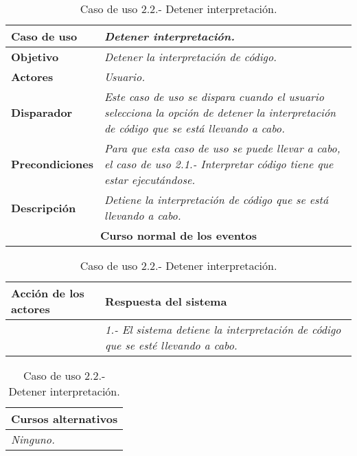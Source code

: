 \documentclass[twoside,a4paper,11pt]{book}
\begin{document}
\begin{table}[!ht]
    \centering
    \begin{tabular}{|p{4cm}|p{11.5cm}|}
    \hline

    \textbf{Caso de uso} & \textit{Detener interpretación.}\\
    \hline

    \textbf{Objetivo} & \textit{Detener la interpretación de código.}\\
    \hline

    \textbf{Actores} & \textit{Usuario.}\\
    \hline

    \textbf{Disparador} & \textit{Este caso de uso se dispara cuando el usuario selecciona la opción de detener la interpretación de código que se está
				  llevando a cabo.}\\
    \hline

    \textbf{Precondiciones} & \textit{Para que esta caso de uso se puede llevar a cabo, el caso de uso 2.1.- Interpretar código tiene que estar
				      ejecutándose.}\\
    \hline

    \textbf{Descripción} & \textit{Detiene la interpretación de código que se está llevando a cabo.}\\
    \hline

    \multicolumn{2}{|c|}{\textbf{Curso normal de los eventos}}\\
    \hline

    \end{tabular}
    \begin{tabular}{|p{7.75cm}|p{7.75cm}|}
    \hspace{2cm}\textbf{Acción de los actores} & \hspace{1.75cm}\textbf{Respuesta del sistema}\\
    \hline

    &
    \textit{1.- El sistema detiene la interpretación de código que se esté llevando a cabo.}
    \\
    \hline
    \end{tabular}

    \begin{tabular}{|p{15.9cm}|}
      \hspace{6cm}\textbf{Cursos alternativos}\\
      \hline     
	\textit{Ninguno.}
      \\
      \hline
    \end{tabular}
    \caption{Caso de uso 2.2.- Detener interpretación.}
\end{table}
\end{document}
